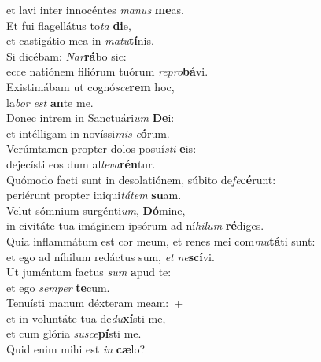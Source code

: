 \oddverse et lavi inter innocéntes \textit{ma}\textit{nus} \textbf{me}as.\\
\evenverse Et fui flagellátus to\textit{ta} \textbf{di}e,~\*\\
\evenverse et castigátio mea in \textit{ma}\textit{tu}\textbf{tí}nis.\\
\oddverse Si dicébam: \textit{Nar}\textbf{rá}bo sic:~\*\\
\oddverse ecce natiónem filiórum tuórum \textit{re}\textit{pro}\textbf{bá}vi.\\
\evenverse Existimábam ut cognó\textit{sce}\textbf{rem} hoc,~\*\\
\evenverse la\textit{bor} \textit{est} \textbf{an}te me.\\
\oddverse Donec intrem in Sanctuári\textit{um} \textbf{De}i:~\*\\
\oddverse et intélligam in novíssi\textit{mis} \textit{e}\textbf{ó}rum.\\
\evenverse Verúmtamen propter dolos posuí\textit{sti} \textbf{e}is:~\*\\
\evenverse dejecísti eos dum al\textit{le}\textit{va}\textbf{rén}tur.\\
\oddverse Quómodo facti sunt in desolatiónem, súbito de\textit{fe}\textbf{cé}runt:~\*\\
\oddverse periérunt propter iniqui\textit{tá}\textit{tem} \textbf{su}am.\\
\evenverse Velut sómnium surgénti\textit{um}, \textbf{Dó}mine,~\*\\
\evenverse in civitáte tua imáginem ipsórum ad ní\textit{hi}\textit{lum} \textbf{ré}diges.\\
\oddverse Quia inflammátum est cor meum, et renes mei com\textit{mu}\textbf{tá}ti sunt:~\*\\
\oddverse et ego ad níhilum redáctus sum, \textit{et} \textit{ne}\textbf{scí}vi.\\
\evenverse Ut juméntum factus \textit{sum} \textbf{a}pud te:~\*\\
\evenverse et ego \textit{sem}\textit{per} \textbf{te}cum.\\
\oddverse Tenuísti manum déxteram meam:~+\\
\oddverse  et in voluntáte tua de\textit{du}\textbf{xí}sti me,~\*\\
\oddverse et cum glória \textit{su}\textit{sce}\textbf{pí}sti me.\\
\evenverse Quid enim mihi est \textit{in} \textbf{cæ}lo?~\*\\
